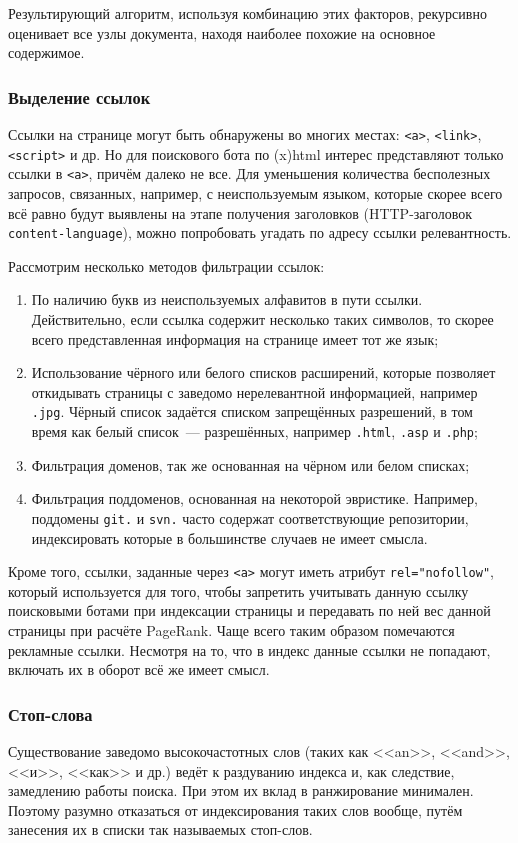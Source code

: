 Результирующий алгоритм, используя комбинацию этих факторов, рекурсивно оценивает все узлы документа, находя наиболее похожие на основное содержимое.


\subsubsection{Выделение ссылок} \label{sssec:links}
Ссылки на странице могут быть обнаружены во многих местах: \verb|<a>|, \verb|<link>|, \verb|<script>| и др. Но для поискового бота по (x)html интерес представляют только ссылки в \verb|<a>|, причём далеко не все. Для уменьшения количества бесполезных запросов, связанных, например, с неиспользуемым языком, которые скорее всего всё равно будут выявлены на этапе получения заголовков (HTTP-заголовок \verb|content-language|), можно попробовать угадать по адресу ссылки релевантность.

Рассмотрим несколько методов фильтрации ссылок:
\begin{enumerate}
  \item По наличию букв из неиспользуемых алфавитов в пути ссылки. Действительно, если ссылка содержит несколько таких символов, то скорее всего представленная информация на странице имеет тот же язык;
  \item Использование чёрного или белого списков расширений, которые позволяет откидывать страницы с заведомо нерелевантной информацией, например \verb|.jpg|. Чёрный список задаётся списком запрещённых разрешений, в том время как белый список~--- разрешённых, например \verb|.html|, \verb|.asp| и \verb|.php|;
  \item Фильтрация доменов, так же основанная на чёрном или белом списках;
  \item Фильтрация поддоменов, основанная на некоторой эвристике. Например, поддомены \verb|git.| и \verb|svn.| часто содержат соответствующие репозитории, индексировать которые в большинстве случаев не имеет смысла.
\end{enumerate}


Кроме того, ссылки, заданные через \verb|<a>| могут иметь атрибут \verb|rel="nofollow"|, который используется для того, чтобы запретить учитывать данную ссылку поисковыми ботами при индексации страницы и передавать по ней вес данной страницы при расчёте PageRank. Чаще всего таким образом помечаются рекламные ссылки. Несмотря на то, что в индекс данные ссылки не попадают, включать их в оборот всё же имеет смысл.


\subsubsection{Стоп-слова}
Существование заведомо высокочастотных слов (таких как <<an>>, <<and>>, <<и>>, <<как>> и др.) ведёт к раздуванию индекса и, как следствие, замедлению работы поиска. При этом их вклад в ранжирование минимален. Поэтому разумно отказаться от индексирования таких слов вообще, путём занесения их в списки так называемых стоп-слов.


